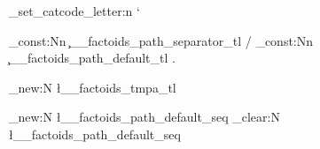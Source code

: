 \usepackage{expl3}
\usepackage{xparse}

\everymath{\displaystyle}

\usepackage[T1]{fontenc}
\usepackage{amsthm, amsmath, amssymb}
\usepackage[fixamsmath]{mathtools}  %
\usepackage[cal=cm, scr=rsfs, frak=euler, bb=ams]{mathalpha}
\usepackage{lmodern}

\usepackage{cancel}
\usepackage[nointegrals]{wasysym}

\usepackage{mleftright}
\mleftright
\usepackage{physics}  %
\usepackage{quiver}  %
\usetikzlibrary{angles}
\usetikzlibrary{positioning} %
\usepackage{microtype}  %
\usepackage{mathrsfs}  %
\usepackage{polynom}

\usepackage{hwemoji}  %

\def\mbb#1{\mathbb{#1}}
\def\mfk#1{\mathfrak{#1}}

\def\N{\mbb{N}}
\def\C{\mbb{C}}
\def\R{\mbb{R}}
\def\pr{\mbb{P}}
\def\Q{\mbb{Q}}
\def\Z{\mbb{Z}}

\def\la{\leftarrow}
\def\La{\Leftarrow}
\def\ra{\rightarrow}
\def\Ra{\Rightarrow}
\def\lp{\left(}
\def\rp{\right)}
\def\lk{\left[}
\def\rk{\right]}
\def\lb{\left\{}
\def\rb{\right\}}

\def\del{\nabla}
\def\eps{\varepsilon}
\def\inv{{-1}}
\def\pa{\partial}
\def\vp{\varphi}
\def\y{\infty}
\def\th{\theta}

\newcommand{\pdif}[3]{\frac{\partial^{#3}#1}{\partial#2^{#3}}}
\DeclarePairedDelimiter\floor{\lfloor}{\rfloor}
\DeclarePairedDelimiter\ceil{\lceil}{\rceil}

\ExplSyntaxOn
\char_set_catcode_letter:n { `\@ }


\tl_const:Nn \c__factoids_path_separator_tl { / }
\tl_const:Nn \c__factoids_path_default_tl   { . }

\tl_new:N \l__factoids_tmpa_tl

\seq_new:N   \l__factoids_path_default_seq
\seq_clear:N \l__factoids_path_default_seq

